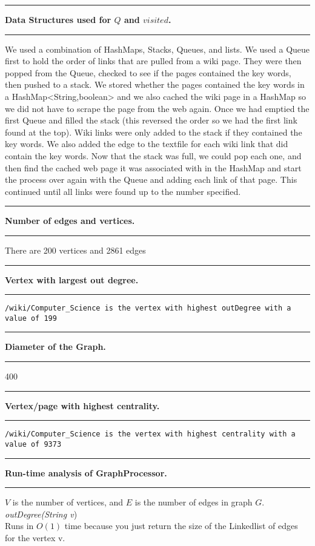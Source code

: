 \documentclass[11pt]{article}
\newcommand\question[2]{\vspace{.25in}\hrule\textbf{#1. #2}\vspace{.5em}\hrule\vspace{.10in}}
\begin{document}
\raggedright
\newcommand\NAME{Devin Johnson, Mason Wray}  %
\newcommand\HWNUM{ PA2}                      %



\question{Data Structures used for $Q$ and $visited$}{}
We used a combination of HashMaps, Stacks, Queues, and lists.  We used a Queue first to hold the order of links that are pulled from a wiki page.  They were then popped from the Queue, checked to see if the pages contained the key words, then pushed to a stack.  We stored whether the pages contained the key words in a HashMap<String,boolean> and we also cached the wiki page in a HashMap so we did not have to scrape the page from the web again.  Once we had emptied the first Queue and filled the stack (this reversed the order so we had the first link found at the top).  Wiki links were only added to the stack if they contained the key words.  We also added the edge to the textfile for each wiki link that did contain the key words.  Now that the stack was full, we could pop each one, and then find the cached web page it was associated with in the HashMap and start the process over again with the Queue and adding each link of that page.  This continued until all links were found up to the number specified.\\

\question{Number of edges and vertices}{}
There are 200 vertices and 2861 edges

\question{Vertex with largest out degree}{}
\begin{verbatim}
/wiki/Computer_Science is the vertex with highest outDegree with a value of 199
\end{verbatim}


\question{Diameter of the Graph}{}
400

\question{Vertex/page with highest centrality}{}
\begin{verbatim}
/wiki/Computer_Science is the vertex with highest centrality with a value of 9373
\end{verbatim}


\question{Run-time analysis of GraphProcessor}{}
$V$ is the number of vertices, and $E$ is the number of edges in graph $G$.\\ 
\vspace{2mm}
\textit{outDegree(String v})\\
Runs in $O(1)$ time because you just return the size of the Linkedlist of edges for the vertex v.
\end{document}
